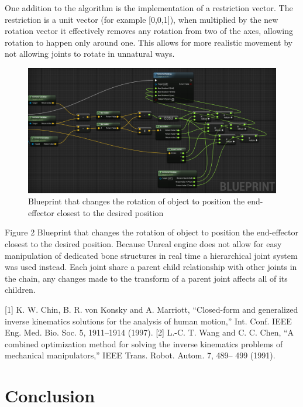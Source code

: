 One addition to the algorithm is the implementation of a restriction vector. The restriction is a unit vector (for example [0,0,1]), when multiplied by the new rotation vector it effectively removes any rotation from two of the axes, allowing rotation to happen only around one. This allows for more realistic movement by not allowing joints to rotate in unnatural ways.
 \begin{figure}[h]
 \centering
 \includegraphics[scale=1]{CCD/CCDBlueprint.png}
 \caption{Blueprint that changes the rotation of object to position the end-effector closest to the desired position}
 \end{figure}
 
Figure 2 Blueprint that changes the rotation of object to position the end-effector closest to the desired position.
Because Unreal engine does not allow for easy manipulation of dedicated bone structures in real time a hierarchical joint system was used instead. Each joint share a parent child relationship with other joints in the chain, any changes made to the transform of a parent joint affects all of its children.


[1] K. W. Chin, B. R. von Konsky and A. Marriott, “Closed-form and generalized inverse kinematics solutions for the analysis of human motion,” Int. Conf. IEEE Eng. Med. Bio. Soc. 5, 1911–1914 (1997).
[2] L.-C. T. Wang and C. C. Chen, “A combined optimization method for solving the inverse kinematics problems of mechanical manipulators,” IEEE Trans. Robot. Autom. 7, 489– 499 (1991).



\section{Conclusion}
